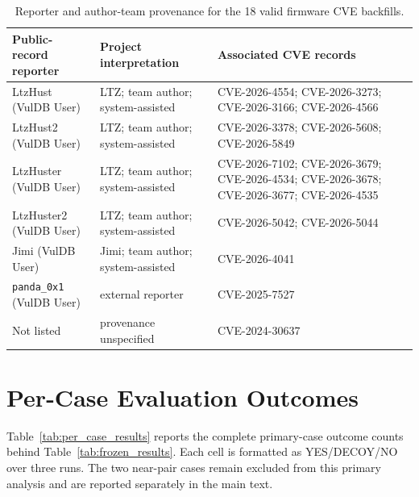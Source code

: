 \documentclass[11pt]{article}
\newcommand{\tableformat}{\small\setlength{\tabcolsep}{4pt}\renewcommand{\arraystretch}{1.12}}
\newcommand{\thead}[1]{\textbf{#1}}
\begin{document}
\begin{table}[H]
\centering
\caption{Reporter and author-team provenance for the 18 valid firmware CVE backfills.}
\label{tab:reporter_provenance}
\tableformat
\begin{tabularx}{\textwidth}{L{0.25\textwidth} L{0.24\textwidth} Y}
\toprule
\thead{Public-record reporter} & \thead{Project interpretation} & \thead{Associated CVE records} \\
\midrule
LtzHust (VulDB User) & LTZ; team author; system-assisted & CVE-2026-4554; CVE-2026-3273; CVE-2026-3166; CVE-2026-4566 \\
LtzHust2 (VulDB User) & LTZ; team author; system-assisted & CVE-2026-3378; CVE-2026-5608; CVE-2026-5849 \\
LtzHuster (VulDB User) & LTZ; team author; system-assisted & CVE-2026-7102; CVE-2026-3679; CVE-2026-4534; CVE-2026-3678; CVE-2026-3677; CVE-2026-4535 \\
LtzHuster2 (VulDB User) & LTZ; team author; system-assisted & CVE-2026-5042; CVE-2026-5044 \\
\addlinespace[2pt]
Jimi (VulDB User) & Jimi; team author; system-assisted & CVE-2026-4041 \\
\addlinespace[2pt]
\texttt{panda\_0x1} (VulDB User) & external reporter & CVE-2025-7527 \\
Not listed & provenance unspecified & CVE-2024-30637 \\
\bottomrule
\end{tabularx}
\end{table}

\section{Per-Case Evaluation Outcomes}
\label{app:per_case_results}

Table~\ref{tab:per_case_results} reports the complete primary-case outcome counts behind
Table~\ref{tab:frozen_results}.  Each cell is formatted as YES/DECOY/NO over three runs.
The two near-pair cases remain excluded from this primary analysis and are reported
separately in the main text.
\end{document}
